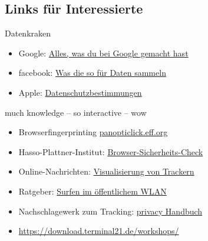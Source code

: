 \documentclass[hyperref={colorlinks,linkcolor=white}, utf8]{beamer}
\begin{document}
	\subsection{Links für Interessierte}
	\begin{frame}{Datenkraken}
			\noindent
			\begin{itemize}
				\item Google: \href{https://myactivity.google.com/}{Alles, was du bei Google gemacht hast}
				\item facebook: \href{https://netzpolitik.org/2016/98-daten-die-facebook-ueber-dich-weiss-und-nutzt-um-werbung-auf-dich-zuzuschneiden/}{Was die so für Daten sammeln}
				\item Apple: \href{https://www.apple.com/privacy/privacy-policy/}{Datenschutzbestimmungen}
			\end{itemize}
	\end{frame}
	
		\begin{frame}{much knowledge -- so interactive -- wow}
			\noindent
			\begin{itemize}
				\item Browserfingerprinting \href{https://panopticlick.eff.org}{panopticlick.eff.org}
				\item Hasso-Plattner-Institut: \href{https://sec.hpi.de/vulndb/sd_first/}{Browser-Sicherheits-Check}
				\item Online-Nachrichten: \href{https://trackography.org/}{Visualisierung von Trackern}
				\item Ratgeber: \href{https://www.mbem.nrw/unterwegs-im-oeffentlichen-wlan-aber-gut-geschuetzt}{Surfen im öffentlichem WLAN }
				\item Nachschlagewerk zum Tracking: \href{https://privacy-handbuch.de/}{privacy Handbuch}
				\item \url{https://download.terminal21.de/workshops/}
			\end{itemize}
		\end{frame}
	
	
	
\end{document}
